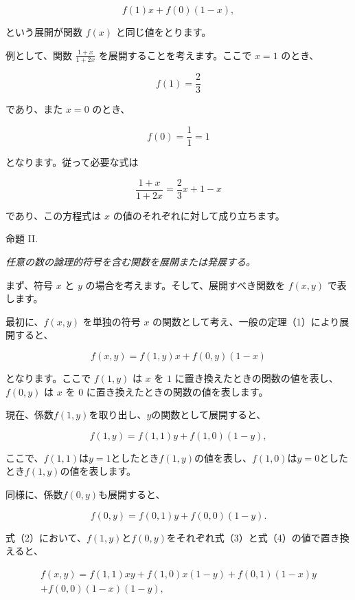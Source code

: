 \documentclass[a4paper,11pt,openany]{ltjsbook}
\begin{document}
\[
f(1)x + f(0)(1-x),
\]

という展開が関数 \( f(x) \) と同じ値をとります。

例として、関数 \( \frac{1+x}{1+2x} \) を展開することを考えます。ここで \( x = 1 \) のとき、

\[
f(1) = \frac{2}{3}
\]

であり、また \( x = 0 \) のとき、

\[
f(0) = \frac{1}{1} = 1
\]

となります。従って必要な式は

\[
\frac{1+x}{1+2x} = \frac{2}{3}x + 1 - x
\]

であり、この方程式は \( x \) の値のそれぞれに対して成り立ちます。

\begin{center}
\textsc{命題 II.}
\end{center}

\textit{任意の数の論理的符号を含む関数を展開または発展する。}

まず、符号 \( x \) と \( y \) の場合を考えます。そして、展開すべき関数を \( f(x, y) \) で表します。

最初に、\( f(x, y) \) を単独の符号 \( x \) の関数として考え、一般の定理（1）により展開すると、

\[
f(x,y) = f(1,y)x + f(0,y)(1-x)
\]

となります。ここで \( f(1, y) \) は \( x \) を \( 1 \) に置き換えたときの関数の値を表し、\( f(0, y) \) は \( x \) を \( 0 \) に置き換えたときの関数の値を表します。

現在、係数$f(1, y)$を取り出し、$y$の関数として展開すると、

\begin{equation}
f(1, y) = f(1, 1)y + f(1, 0)(1 - y),
\end{equation}

ここで、$f(1, 1)$は$y=1$としたとき$f(1, y)$の値を表し、$f(1, 0)$は$y=0$としたとき$f(1, y)$の値を表します。

同様に、係数$f(0, y)$も展開すると、

\begin{equation}
f(0, y) = f(0, 1)y + f(0, 0)(1 - y).
\end{equation}

式（2）において、$f(1, y)$と$f(0, y)$をそれぞれ式（3）と式（4）の値で置き換えると、

\begin{eqnarray}
f(x, y) = f(1, 1)xy
         + f(1, 0)x(1 - y)
         + f(0, 1)(1 - x)y\\
         + f(0, 0)(1 - x)(1 - y),
\end{eqnarray}
\end{document}
